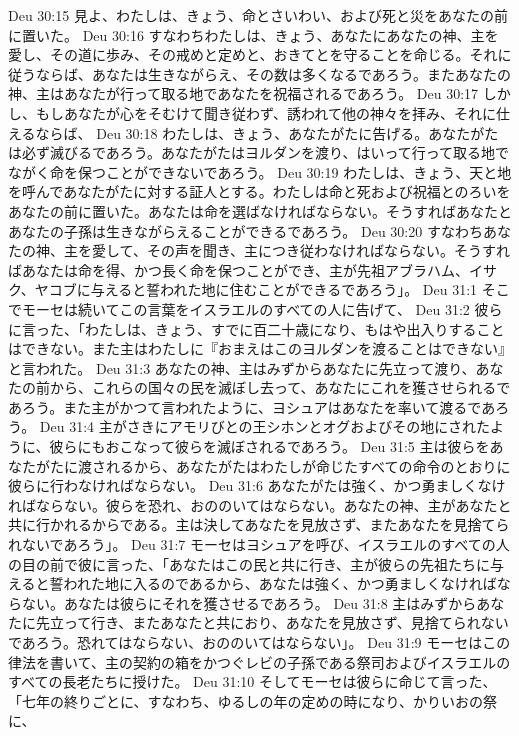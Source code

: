 Deu 30:15  見よ、わたしは、きょう、命とさいわい、および死と災をあなたの前に置いた。
Deu 30:16  すなわちわたしは、きょう、あなたにあなたの神、主を愛し、その道に歩み、その戒めと定めと、おきてとを守ることを命じる。それに従うならば、あなたは生きながらえ、その数は多くなるであろう。またあなたの神、主はあなたが行って取る地であなたを祝福されるであろう。
Deu 30:17  しかし、もしあなたが心をそむけて聞き従わず、誘われて他の神々を拝み、それに仕えるならば、
Deu 30:18  わたしは、きょう、あなたがたに告げる。あなたがたは必ず滅びるであろう。あなたがたはヨルダンを渡り、はいって行って取る地でながく命を保つことができないであろう。
Deu 30:19  わたしは、きょう、天と地を呼んであなたがたに対する証人とする。わたしは命と死および祝福とのろいをあなたの前に置いた。あなたは命を選ばなければならない。そうすればあなたとあなたの子孫は生きながらえることができるであろう。
Deu 30:20  すなわちあなたの神、主を愛して、その声を聞き、主につき従わなければならない。そうすればあなたは命を得、かつ長く命を保つことができ、主が先祖アブラハム、イサク、ヤコブに与えると誓われた地に住むことができるであろう」。
Deu 31:1  そこでモーセは続いてこの言葉をイスラエルのすべての人に告げて、
Deu 31:2  彼らに言った、「わたしは、きょう、すでに百二十歳になり、もはや出入りすることはできない。また主はわたしに『おまえはこのヨルダンを渡ることはできない』と言われた。
Deu 31:3  あなたの神、主はみずからあなたに先立って渡り、あなたの前から、これらの国々の民を滅ぼし去って、あなたにこれを獲させられるであろう。また主がかつて言われたように、ヨシュアはあなたを率いて渡るであろう。
Deu 31:4  主がさきにアモリびとの王シホンとオグおよびその地にされたように、彼らにもおこなって彼らを滅ぼされるであろう。
Deu 31:5  主は彼らをあなたがたに渡されるから、あなたがたはわたしが命じたすべての命令のとおりに彼らに行わなければならない。
Deu 31:6  あなたがたは強く、かつ勇ましくなければならない。彼らを恐れ、おののいてはならない。あなたの神、主があなたと共に行かれるからである。主は決してあなたを見放さず、またあなたを見捨てられないであろう」。
Deu 31:7  モーセはヨシュアを呼び、イスラエルのすべての人の目の前で彼に言った、「あなたはこの民と共に行き、主が彼らの先祖たちに与えると誓われた地に入るのであるから、あなたは強く、かつ勇ましくなければならない。あなたは彼らにそれを獲させるであろう。
Deu 31:8  主はみずからあなたに先立って行き、またあなたと共におり、あなたを見放さず、見捨てられないであろう。恐れてはならない、おののいてはならない」。
Deu 31:9  モーセはこの律法を書いて、主の契約の箱をかつぐレビの子孫である祭司およびイスラエルのすべての長老たちに授けた。
Deu 31:10  そしてモーセは彼らに命じて言った、「七年の終りごとに、すなわち、ゆるしの年の定めの時になり、かりいおの祭に、
